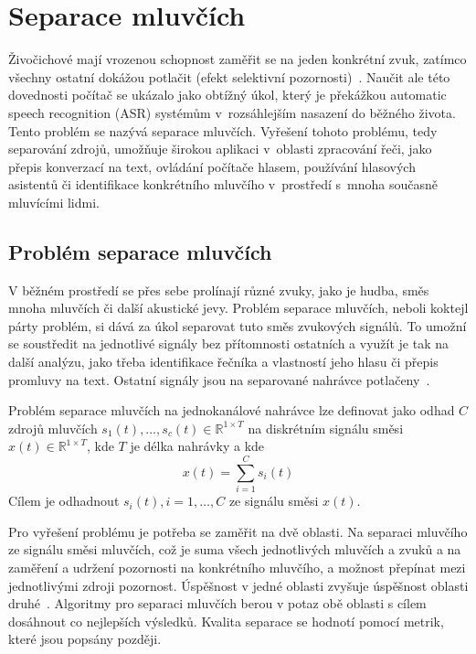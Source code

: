 \chapter{Separace mluvčích}
\label{separace}
Živočichové mají vrozenou schopnost zaměřit se na jeden konkrétní zvuk, zatímco všechny ostatní dokážou potlačit (efekt selektivní pozornosti)~\cite{GETZMANN20171}. Naučit ale této dovednosti počítač se ukázalo jako obtížný úkol, který je překážkou automatic speech recognition (ASR) systémům v~rozsáhlejším nasazení do běžného života. Tento problém se nazývá separace mluvčích. Vyřešení tohoto problému, tedy separování zdrojů, umožňuje širokou aplikaci v~oblasti zpracování řeči, jako přepis konverzací na text, ovládání počítače hlasem, používání hlasových asistentů či identifikace konkrétního mluvčího v~prostředí s~mnoha současně mluvícími lidmi.


\section{Problém separace mluvčích}
V běžném prostředí se přes sebe prolínají různé zvuky, jako je hudba, směs mnoha mluvčích či další akustické jevy. Problém separace mluvčích, neboli koktejl párty problém, si dává za úkol separovat tuto směs zvukových signálů. To umožní se soustředit na jednotlivé signály bez přítomnosti ostatních a využít je tak na další analýzu, jako třeba identifikace řečníka a vlastností jeho hlasu či přepis promluvy na text. Ostatní signály jsou na separované nahrávce potlačeny~\cite{cocktailparty}.

Problém separace mluvčích na jednokanálové nahrávce lze definovat jako odhad $C$ zdrojů mluvčích $s_1(t), \dots, s_c(t) \in \mathbb{R}^{1 \times T}$ na diskrétním signálu směsi $x(t)\in \mathbb{R}^{1 \times T}$, kde $T$ je délka nahrávky a kde
\begin{equation}
  x(t) = \sum_{i=1}^C s_i(t)
  \label{equ:definiceseparace}
\end{equation}
Cílem je odhadnout $s_i(t), i = 1, \dots, C$ ze signálu směsi $x(t)$.

Pro vyřešení problému je potřeba se zaměřit na dvě oblasti. Na separaci mluvčího ze signálu směsi mluvčích, což je suma všech jednotlivých mluvčích a zvuků a na zaměření a udržení pozornosti na konkrétního mluvčího, a možnost přepínat mezi jednotlivými zdroji pozornost. Úspěšnost v jedné oblasti zvyšuje úspěšnost oblasti druhé~\cite{cocktailparty}. Algoritmy pro separaci mluvčích berou v potaz obě oblasti s cílem dosáhnout co nejlepších výsledků. Kvalita separace se hodnotí pomocí metrik, které jsou popsány později. 


